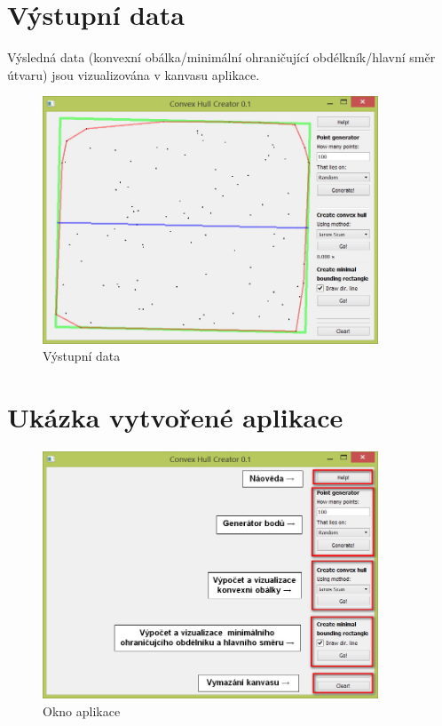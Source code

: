 \documentclass[a4paper, 12pt]{article}
\begin{document}
\section{Výstupní data}
Výsledná data (konvexní obálka/minimální ohraničující obdélkník/hlavní směr útvaru) jsou vizualizována v kanvasu aplikace.   \\
\begin{figure}[h]
	\centering
	\includegraphics[width=10cm]{min_bound.jpg}
	\caption{Výstupní data}
\end{figure}


\clearpage
\section{Ukázka vytvořené aplikace}
\begin{figure}[h!]
	\centering
	\includegraphics[width=10cm]{popis.jpg}
	\caption{Okno aplikace}
\end{figure}
\end{document}
